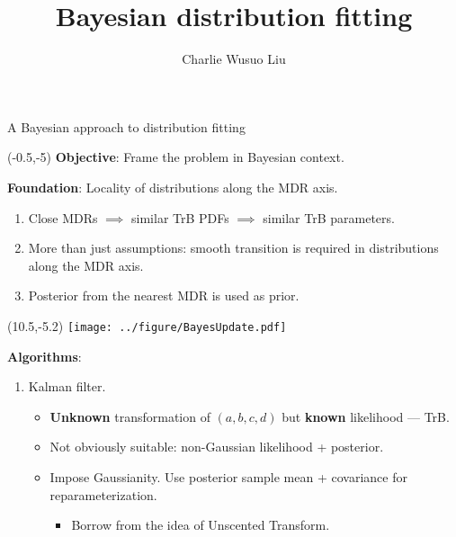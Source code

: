 \documentclass[aspectratio=169]{beamer}
\title{Bayesian distribution fitting}
\author{Charlie Wusuo Liu}
\begin{document}
\begin{frame}{A Bayesian approach to distribution fitting}
\begin{textblock}{10.5}(-0.5,-5)
\tiny\textbf{Objective}: Frame the problem in Bayesian context.\medskip

\tiny\textbf{Foundation}: Locality of distributions along the MDR axis.\medskip

\begin{enumerate}
\item Close MDRs $\implies$ similar TrB PDFs $\implies$ similar TrB parameters.\medskip

\item More than just assumptions: smooth transition is required in distributions along the MDR axis.\medskip 

\item Posterior from the nearest MDR is used as prior.\medskip
\end{enumerate}%

\begin{textblock}{1}(10.5,-5.2)
\texttt{[image: ../figure/BayesUpdate.pdf]}
\end{textblock}%

\tiny\textbf{Algorithms}:\medskip

\begin{enumerate}

\tiny\item Kalman filter.\medskip

\begin{itemize}

\tiny\item \textbf{Unknown} transformation of $(a, b, c, d)$ but \textbf{known} likelihood --- TrB.\medskip 

\tiny\item Not obviously suitable: non-Gaussian likelihood + posterior. \medskip

\tiny\item Impose Gaussianity. Use posterior sample mean + covariance for reparameterization.\medskip

\begin{itemize}
\tiny\item Borrow from the idea of Unscented Transform.\medskip
\end{itemize}
\end{itemize}
\end{enumerate}
\end{textblock}


\end{frame}
\end{document}
